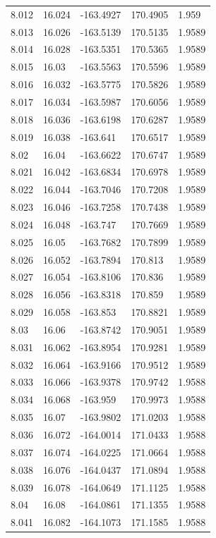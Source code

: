 \begin{tabular}{lllll}
8.012 & 16.024 & -163.4927 & 170.4905 & 1.959 \\
8.013 & 16.026 & -163.5139 & 170.5135 & 1.9589 \\
8.014 & 16.028 & -163.5351 & 170.5365 & 1.9589 \\
8.015 & 16.03 & -163.5563 & 170.5596 & 1.9589 \\
8.016 & 16.032 & -163.5775 & 170.5826 & 1.9589 \\
8.017 & 16.034 & -163.5987 & 170.6056 & 1.9589 \\
8.018 & 16.036 & -163.6198 & 170.6287 & 1.9589 \\
8.019 & 16.038 & -163.641 & 170.6517 & 1.9589 \\
8.02 & 16.04 & -163.6622 & 170.6747 & 1.9589 \\
8.021 & 16.042 & -163.6834 & 170.6978 & 1.9589 \\
8.022 & 16.044 & -163.7046 & 170.7208 & 1.9589 \\
8.023 & 16.046 & -163.7258 & 170.7438 & 1.9589 \\
8.024 & 16.048 & -163.747 & 170.7669 & 1.9589 \\
8.025 & 16.05 & -163.7682 & 170.7899 & 1.9589 \\
8.026 & 16.052 & -163.7894 & 170.813 & 1.9589 \\
8.027 & 16.054 & -163.8106 & 170.836 & 1.9589 \\
8.028 & 16.056 & -163.8318 & 170.859 & 1.9589 \\
8.029 & 16.058 & -163.853 & 170.8821 & 1.9589 \\
8.03 & 16.06 & -163.8742 & 170.9051 & 1.9589 \\
8.031 & 16.062 & -163.8954 & 170.9281 & 1.9589 \\
8.032 & 16.064 & -163.9166 & 170.9512 & 1.9589 \\
8.033 & 16.066 & -163.9378 & 170.9742 & 1.9588 \\
8.034 & 16.068 & -163.959 & 170.9973 & 1.9588 \\
8.035 & 16.07 & -163.9802 & 171.0203 & 1.9588 \\
8.036 & 16.072 & -164.0014 & 171.0433 & 1.9588 \\
8.037 & 16.074 & -164.0225 & 171.0664 & 1.9588 \\
8.038 & 16.076 & -164.0437 & 171.0894 & 1.9588 \\
8.039 & 16.078 & -164.0649 & 171.1125 & 1.9588 \\
8.04 & 16.08 & -164.0861 & 171.1355 & 1.9588 \\
8.041 & 16.082 & -164.1073 & 171.1585 & 1.9588 \\

\end{tabular}
